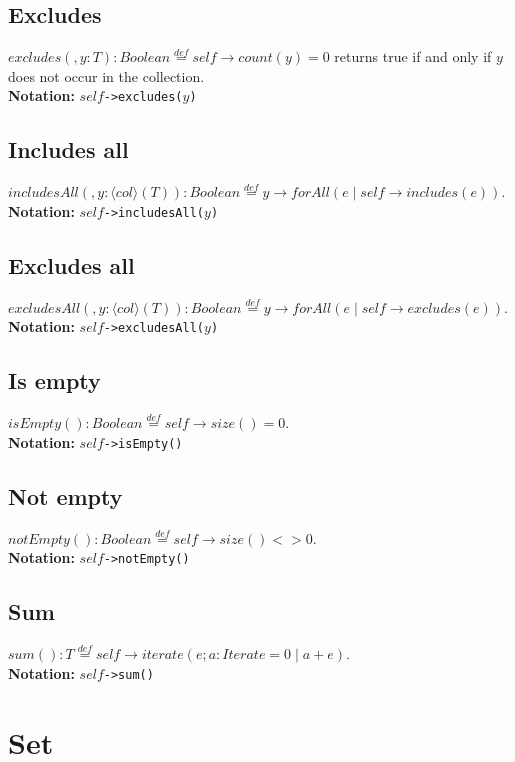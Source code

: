 \subsection{Excludes}
$\mathit{excludes}(,y:T):\mathit{Boolean}\stackrel{def}{=}\mathit{self}\rightarrow\mathit{count}(y)=0$
  returns true if and only if $y$ does not occur in the collection.\\
  {\bf Notation:} $\mathit{self}$\verb+->excludes(+$y$\verb+)+
\subsection{Includes all}
$\mathit{includesAll}(,y:\langle\mathit{col}\rangle(T)):\mathit{Boolean}\stackrel{def}{=}
  y\rightarrow\mathit{forAll}(e\mid \mathit{self}\rightarrow\mathit{includes}(e))$.\\
  {\bf Notation:} $\mathit{self}$\verb+->includesAll(+$y$\verb+)+
\subsection{Excludes all}
$\mathit{excludesAll}(,y:\langle\mathit{col}\rangle(T)):\mathit{Boolean}\stackrel{def}{=}
  y\rightarrow\mathit{forAll}(e\mid \mathit{self}\rightarrow\mathit{excludes}(e))$.\\
  {\bf Notation:} $\mathit{self}$\verb+->excludesAll(+$y$\verb+)+
\subsection{Is empty}
$\mathit{isEmpty}():\mathit{Boolean}\stackrel{def}{=}\mathit{self}\rightarrow\mathit{size}()=0$.\\
  {\bf Notation:} $\mathit{self}$\verb+->isEmpty()+
\subsection{Not empty}
$\mathit{notEmpty}():\mathit{Boolean}\stackrel{def}{=}\mathit{self}\rightarrow\mathit{size}()<>0$.\\
  {\bf Notation:} $\mathit{self}$\verb+->notEmpty()+
\subsection{Sum}
$\mathit{sum}():T\stackrel{def}{=}\mathit{self}\rightarrow\mathit{iterate}(e;a:\mathit{Iterate}=0\mid a +
e)$.\\
 {\bf Notation:} $\mathit{self}$\verb+->sum()+
\section{Set}
